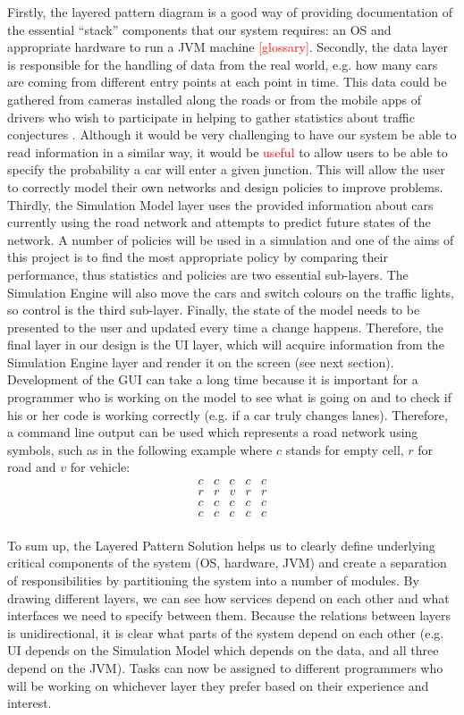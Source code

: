 \documentclass{article}
\begin{document}
Firstly, the layered pattern diagram is a good way of providing documentation of the essential “stack” components that our system requires: an OS and appropriate hardware to run a JVM machine \textcolor{red}{[glossary]}. 
Secondly, the data layer is responsible for the handling of data from the real world, e.g. how many cars are coming from different entry points at each point in time. 
This data could be gathered from cameras installed along the roads or from the mobile apps of drivers who wish to participate in helping to gather statistics about traffic conjectures \cite{NCTA}. 
Although it would be very challenging to have our system be able to read information in a similar way, it would be \textcolor{red}{useful} to allow users to be able to specify the probability a car will enter a given junction. 
This will allow the user to correctly model their own networks and design policies to improve problems. Thirdly, the Simulation Model layer uses the provided information about cars currently using the road network and attempts to predict future states of the network. 
A number of policies will be used in a simulation and one of the aims of this project is to find the most appropriate policy by comparing their performance, thus statistics and policies are two essential sub-layers. 
The Simulation Engine will also move the cars and switch colours on the traffic lights, so control is the third sub-layer. 
Finally, the state of the model needs to be presented to the user and updated every time a change happens. 
Therefore, the final layer in our design is the UI layer, which will acquire information from the Simulation Engine layer and render it on the screen (see next section). 
Development of the GUI can take a long time because it is important for a programmer who is working on the model to see what is going on and to check if his or her code is working correctly (e.g. if a car truly changes lanes). 
Therefore, a command line output can be used which represents a road network using symbols, such as in the following example where $c$ stands for empty cell, $r$ for road and $v$ for vehicle: \\

$$
\begin{matrix}
	c & c & c & c & c \\
	r & r & v & r & r \\
	c & c & c & c & c \\
	c & c & c & c & c
\end{matrix}
$$
\\
To sum up, the Layered Pattern Solution helps us to clearly define underlying critical components of the system (OS, hardware, JVM) and create a separation of responsibilities by partitioning the system into a number of modules. 
By drawing different layers, we can see how services depend on each other and what interfaces we need to specify between them. 
Because the relations between layers is unidirectional, it is clear what parts of the system depend on each other (e.g. UI depends on the Simulation Model which depends on the data, and all three depend on the JVM).
Tasks can now be assigned to different programmers who will be working on whichever layer they prefer based on their experience and interest. 
\end{document}
